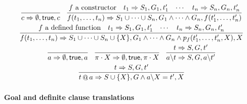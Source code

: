 \documentclass[draft,12pt]{report}
\makeatletter
\newcommand{\abs}{\backslash}
\newcommand{\andd}{\wedge}
\newcommand{\conc}{\mathop{@}}
\makeatother
\begin{document}
\[\begin{array}{c}
\infer{\tflat{c}{\emptyset}{\mathsf{true}}{c}}{}
\quad
\infer{\tflat{f(t_1,\ldots,t_n)}{S_1\cup \cdots \cup S_n}{G_1 \andd
    \cdots \andd G_n}{f(t_1',\ldots,t_n')}}{\text{$f$ a constructor} &
\tflat{t_1}{S_1}{G_1}{t_1'} & \cdots & \tflat{t_n}{S_n}{G_n}{t_n'}}
\smallskip\\
\infer{\tflat{f(t_1,\ldots,t_n)}{S_1\cup \cdots \cup S_n \cup \{X\}}{G_1 \andd
    \cdots \andd G_n \andd p_f(t_1',\ldots,t_n',X)}{X}}{\text{$f$ a defined function} &
\tflat{t_1}{S_1}{G_1}{t_1'} & \cdots & \tflat{t_n}{S_n}{G_n}{t_n'}}
\smallskip\\
\infer{\tflat{a}{\emptyset}{\mathsf{true}}{a}}{}
\quad
\infer{\tflat{\pi \cdot X}{\emptyset}{\mathsf{true}}{\pi\cdot X}}{}
\quad
\infer{\tflat{a \abs t}{S}{G}{a\abs t'}}{\tflat{t}{S}{G}{t'}}
\smallskip\\
\infer{\tflat{t\conc a}{S\cup\{X\}}{G \andd a \abs X = t'}{X}}{\tflat{t}{S}{G}{t'}}
\end{array}\]

\paragraph{Goal and definite clause translations}
\end{document}
